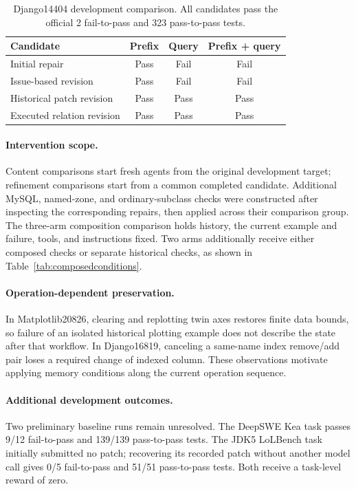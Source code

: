 \begin{table}[htbp]
\centering
\caption{Django14404 development comparison. All candidates pass
the official 2 fail-to-pass and 323 pass-to-pass tests.}
\label{tab:residual}
\begin{tabular}{lccc}
\toprule
Candidate & Prefix & Query & Prefix + query \\
\midrule
Initial repair & Pass & Fail & Fail \\
Issue-based revision & Pass & Fail & Fail \\
Historical patch revision & Pass & Pass & Pass \\
Executed relation revision & Pass & Pass & Pass \\
\bottomrule
\end{tabular}
\end{table}

\paragraph{Intervention scope.}
Content comparisons start fresh agents from the original development target;
refinement comparisons start from a common completed candidate. Additional
MySQL, named-zone, and ordinary-subclass checks were constructed after
inspecting the corresponding repairs, then applied across their comparison
group. The three-arm composition comparison holds history, the current
example and failure, tools, and instructions fixed. Two arms additionally
receive either composed checks or separate historical checks, as shown in
Table~\ref{tab:composedconditions}.

\paragraph{Operation-dependent preservation.}
In Matplotlib20826, clearing and replotting twin axes restores finite data
bounds, so failure of an isolated historical plotting example does not describe
the state after that workflow. In Django16819, canceling a same-name index
remove/add pair loses a required change of indexed column. These observations
motivate applying memory conditions along the current operation sequence.

\paragraph{Additional development outcomes.}
Two preliminary baseline runs remain unresolved. The DeepSWE Kea task
passes 9/12 fail-to-pass and 139/139 pass-to-pass tests. The JDK5 LoLBench
task initially submitted no patch; recovering its recorded patch without
another model call gives 0/5 fail-to-pass and 51/51 pass-to-pass tests.
Both receive a task-level reward of zero.

